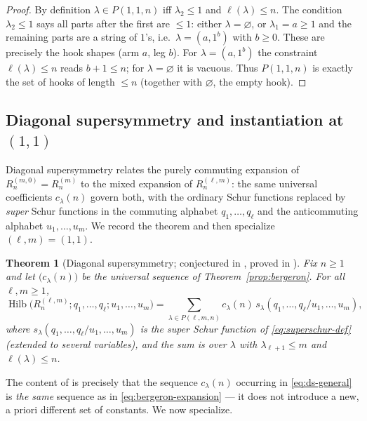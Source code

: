 \documentclass[11pt]{amsart}
\newtheorem{theorem}{Theorem}
\theoremstyle{definition}
\DeclareMathOperator{\Hilb}{Hilb}
\begin{document}
\begin{proof}
By definition $\lambda\in P(1,1,n)$ iff $\lambda_2\le1$ and $\ell(\lambda)\le n$.
The condition $\lambda_2\le1$ says all parts after the first are $\le1$: either
$\lambda=\varnothing$, or $\lambda_1=a\ge1$ and the remaining parts are a string of
$1$'s, i.e.\ $\lambda=(a,1^b)$ with $b\ge0$. These are precisely the hook shapes
(arm $a$, leg $b$). For $\lambda=(a,1^b)$ the constraint $\ell(\lambda)\le n$ reads
$b+1\le n$; for $\lambda=\varnothing$ it is vacuous. Thus $P(1,1,n)$ is exactly the
set of hooks of length $\le n$ (together with $\varnothing$, the empty hook).
\end{proof}

\subsection{Diagonal supersymmetry and instantiation at $(1,1)$}
Diagonal supersymmetry relates the purely commuting expansion of
$R_n^{(m,0)}=R_n^{(m)}$ to the mixed expansion of $R_n^{(\ell,m)}$: the same
universal coefficients $c_\lambda(n)$ govern both, with the ordinary Schur
functions replaced by \emph{super} Schur functions in the commuting alphabet
$q_1,\dots,q_\ell$ and the anticommuting alphabet $u_1,\dots,u_m$. We record the
theorem and then specialize $(\ell,m)=(1,1)$.

\begin{theorem}[Diagonal supersymmetry; conjectured in \cite{Bergeron2020},
proved in \cite{Lentfer-Supersymmetry}]\label{prop:ds-general}
Fix $n\ge1$ and let $\big(c_\lambda(n)\big)$ be the universal sequence of
Theorem~\ref{prop:bergeron}. For all $\ell,m\ge1$,
\begin{equation}\label{eq:ds-general}
\Hilb\big(R_n^{(\ell,m)};q_1,\dots,q_\ell;u_1,\dots,u_m\big)
= \sum_{\lambda\in P(\ell,m,n)} c_\lambda(n)\,
s_\lambda(q_1,\dots,q_\ell/u_1,\dots,u_m),
\end{equation}
where $s_\lambda(q_1,\dots,q_\ell/u_1,\dots,u_m)$ is the super Schur function of
\eqref{eq:superschur-def} (extended to several variables), and the sum is over
$\lambda$ with $\lambda_{\ell+1}\le m$ and $\ell(\lambda)\le n$.
\end{theorem}

The content of \cite{Lentfer-Supersymmetry} is precisely that the sequence
$c_\lambda(n)$ occurring in \eqref{eq:ds-general} is \emph{the same} sequence as in
\eqref{eq:bergeron-expansion} --- it does not introduce a new, a priori different
set of constants. We now specialize.
\end{document}
